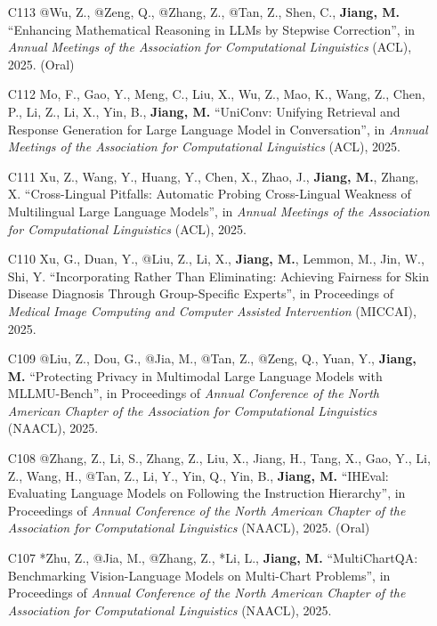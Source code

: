 \documentclass[10pt]{article}
\newenvironment{myindentpar}[1]%
{\begin{list}{}%
         {\setlength{\leftmargin}{#1}}%
         \item[]%
}
{\end{list}}
\newcounter{list}
\begin{document}
\begin{myindentpar}{0.00cm}
\begin{enumerate}[leftmargin=.5cm]
\item[C113] @Wu, Z., @Zeng, Q., @Zhang, Z., @Tan, Z., Shen, C., \textbf{Jiang, M.} ``Enhancing Mathematical Reasoning in LLMs by Stepwise Correction'', in \textit{Annual Meetings of the Association for Computational Linguistics} (ACL), 2025. (Oral)

\item[C112] Mo, F., Gao, Y., Meng, C., Liu, X., Wu, Z., Mao, K., Wang, Z., Chen, P., Li, Z., Li, X., Yin, B., \textbf{Jiang, M.} ``UniConv: Unifying Retrieval and Response Generation for Large Language Model in Conversation'', in \textit{Annual Meetings of the Association for Computational Linguistics} (ACL), 2025.

\item[C111] Xu, Z., Wang, Y., Huang, Y., Chen, X., Zhao, J., \textbf{Jiang, M.}, Zhang, X. ``Cross-Lingual Pitfalls: Automatic Probing Cross-Lingual Weakness of Multilingual Large Language Models'', in \textit{Annual Meetings of the Association for Computational Linguistics} (ACL), 2025.

\item[C110] Xu, G., Duan, Y., @Liu, Z., Li, X., \textbf{Jiang, M.}, Lemmon, M., Jin, W., Shi, Y. ``Incorporating Rather Than Eliminating: Achieving Fairness for Skin Disease Diagnosis Through Group-Specific Experts'', in Proceedings of \textit{Medical Image Computing and Computer Assisted Intervention} (MICCAI), 2025.

\item[C109] @Liu, Z., Dou, G., @Jia, M., @Tan, Z., @Zeng, Q., Yuan, Y., \textbf{Jiang, M.} ``Protecting Privacy in Multimodal Large Language Models with MLLMU-Bench'', in Proceedings of \textit{Annual Conference of the North American Chapter of the Association for Computational Linguistics} (NAACL), 2025.

\item[C108] @Zhang, Z., Li, S., Zhang, Z., Liu, X., Jiang, H., Tang, X., Gao, Y., Li, Z., Wang, H., @Tan, Z., Li, Y., Yin, Q., Yin, B., \textbf{Jiang, M.} ``IHEval: Evaluating Language Models on Following the Instruction Hierarchy'', in Proceedings of \textit{Annual Conference of the North American Chapter of the Association for Computational Linguistics} (NAACL), 2025. (Oral)

\item[C107] *Zhu, Z., @Jia, M., @Zhang, Z., *Li, L., \textbf{Jiang, M.} ``MultiChartQA: Benchmarking Vision-Language Models on Multi-Chart Problems'', in Proceedings of \textit{Annual Conference of the North American Chapter of the Association for Computational Linguistics} (NAACL), 2025.


\end{enumerate}
\end{myindentpar}
\end{document}

